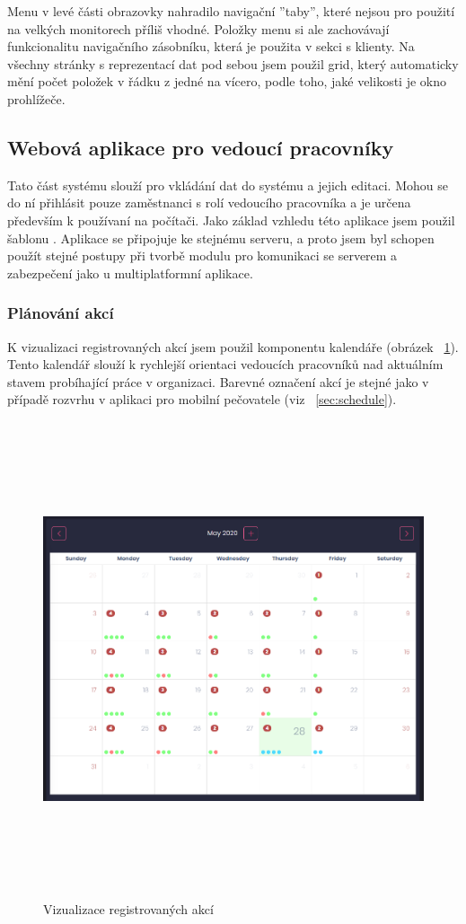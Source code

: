 \documentclass[
  glossaries,
]{kidiplom}
\begin{document}
Menu v levé části obrazovky nahradilo navigační ''taby'', které nejsou pro použití na velkých monitorech příliš vhodné. Položky menu si ale zachovávají funkcionalitu navigačního zásobníku, která je použita v sekci s klienty. Na všechny stránky s reprezentací dat pod sebou jsem použil grid, který automaticky mění počet položek v řádku z jedné na vícero, podle toho, jaké velikosti je okno prohlížeče.

\subsection{Webová aplikace pro vedoucí pracovníky}
Tato část systému slouží pro vkládání dat do systému a jejich editaci. Mohou se do ní přihlásit pouze zaměstnanci s rolí vedoucího pracovníka a je určena především k používaní na počítači. Jako základ vzhledu této aplikace jsem použil šablonu \cite{18}. Aplikace se připojuje ke stejnému serveru, a proto jsem byl schopen použít stejné postupy při tvorbě modulu pro komunikaci se serverem a zabezpečení jako u multiplatformní aplikace.

\subsubsection{Plánování akcí}
K vizualizaci registrovaných akcí jsem použil komponentu kalendáře (obrázek ~\ref{fig:scheduleVisual}). Tento kalendář slouží k rychlejší orientaci vedoucích pracovníků nad aktuálním stavem probíhající práce v organizaci. Barevné označení akcí je stejné jako v případě rozvrhu v aplikaci pro mobilní pečovatele (viz ~\ref{sec:schedule}).

\begin{figure}[H]
  	\centering
 	 \includegraphics[width=14cm,height=14cm,keepaspectratio]{schedule_mngr}
 	 \caption{Vizualizace registrovaných akcí}
 	 \label{fig:scheduleVisual}
\end{figure}
\end{document}
